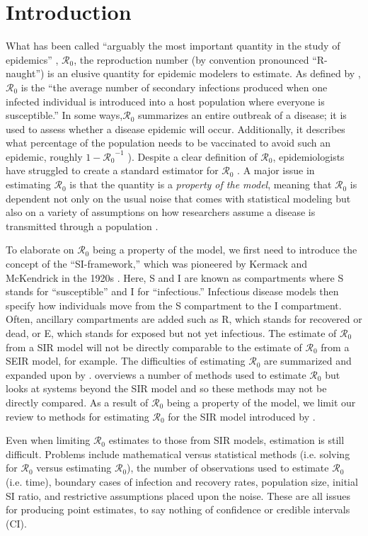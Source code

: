 \documentclass[12pt]{article}
\newcommand{\rr}{\ensuremath{\mathcal{R}_0}}
\begin{document}
\section{Introduction}\label{sec:intro}
What has been called ``arguably the most important quantity in the study of epidemics'' \citep{Heesterbeek2002},  $\mathcal{R}_0$, the reproduction number (by convention pronounced ``R-naught'') is an elusive quantity for epidemic modelers to estimate.  As defined by \citet{anderson1992}, $\rr$ is the ``the average number of secondary infections produced when one infected individual is introduced into a host population where everyone is susceptible.''  In some ways,$\rr$ summarizes an entire outbreak of a disease; it  is used to assess whether a disease epidemic will occur.  Additionally, it describes what percentage of the population needs to be vaccinated to avoid such an epidemic, roughly $1-\rr^{-1}$ \citep{anderson1992}).  Despite a clear definition of $\rr$, epidemiologists have struggled to create a standard  estimator for $\rr$  \citep{hethcote2000}.  A major issue in estimating $\rr$ is that the quantity is a \textit{property of the model}, meaning that $\rr$ is dependent not only on the usual noise that comes with statistical modeling but also on a variety of assumptions on how researchers assume a disease is transmitted through a population \citep{diekmann2009}.

To elaborate on $\rr$ being a property of the model, we first need to introduce the concept of the ``SI-framework,'' which was pioneered by Kermack and McKendrick in the 1920s \citep{getz2006}.   Here, S and I are known as compartments where S stands for ``susceptible'' and I for ``infectious.'' Infectious disease models then specify how individuals move from the S compartment to the I compartment.  Often, ancillary compartments are added such as R, which stands for recovered or dead, or E, which stands for exposed but not yet infectious.  The estimate of $\rr$ from a SIR model will not be directly comparable to the estimate of $\rr$ from a SEIR model, for example.  The difficulties of estimating $\rr$ are summarized and expanded upon by \cite{li2011}.  \cite{driessche2017} overviews a number of methods used to estimate $\rr$ but looks at systems beyond the SIR model and so these methods may not be directly compared.   As a result of $\rr$ being a property of the model, we limit our review to methods for estimating $\rr$ for the SIR model introduced by \cite{Kermack700}.

Even when limiting $\rr$ estimates to those from SIR models, estimation is still difficult.  Problems include mathematical versus statistical methods (i.e. solving for $\rr$ versus estimating $\rr$), the number of observations used to estimate $\rr$ (i.e. time), boundary cases of infection and recovery rates, population size, initial SI ratio, and restrictive assumptions placed upon the noise.  These are all issues for producing point estimates, to say nothing of confidence or credible intervals (CI).
\end{document}
